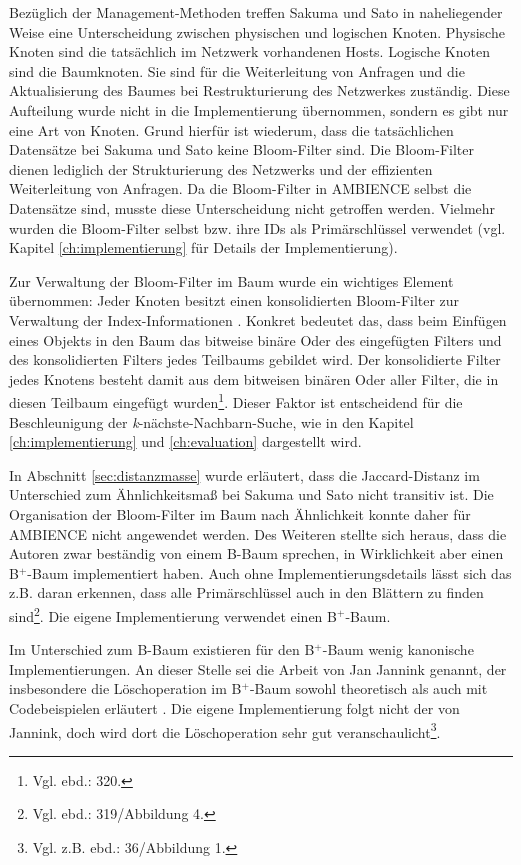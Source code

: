Bezüglich der Management-Methoden treffen Sakuma und Sato in naheliegender Weise eine Unterscheidung zwischen physischen und logischen Knoten. Physische Knoten sind die tatsächlich im Netzwerk vorhandenen Hosts. Logische Knoten sind die Baumknoten. Sie sind für die Weiterleitung von Anfragen und die Aktualisierung des Baumes bei Restrukturierung des Netzwerkes zuständig. Diese Aufteilung wurde nicht in die Implementierung übernommen, sondern es gibt nur eine Art von Knoten. Grund hierfür ist wiederum, dass die tatsächlichen Datensätze bei Sakuma und Sato keine Bloom-Filter sind. Die Bloom-Filter dienen lediglich der Strukturierung des Netzwerks und der effizienten Weiterleitung von Anfragen. Da die Bloom-Filter in AMBIENCE selbst die Datensätze sind, musste diese Unterscheidung nicht getroffen werden. Vielmehr wurden die Bloom-Filter selbst bzw. ihre IDs als Primärschlüssel verwendet (vgl. Kapitel \ref{ch:implementierung} für Details der Implementierung). 

Zur Verwaltung der Bloom-Filter im Baum wurde ein wichtiges Element übernommen: Jeder Knoten besitzt einen konsolidierten Bloom-Filter zur Verwaltung der Index-Informationen \cite{Sakuma2011}. Konkret bedeutet das, dass beim Einfügen eines Objekts in den Baum das bitweise binäre Oder des eingefügten Filters und des konsolidierten Filters jedes Teilbaums gebildet wird. Der konsolidierte Filter jedes Knotens besteht damit aus dem bitweisen binären Oder aller Filter, die in diesen Teilbaum eingefügt wurden\footnote{Vgl. ebd.: 320.}. Dieser Faktor ist entscheidend für die Beschleunigung der \textit{k}-nächste-Nachbarn-Suche, wie in den Kapitel \ref{ch:implementierung} und \ref{ch:evaluation} dargestellt wird. 

In Abschnitt \ref{sec:distanzmasse} wurde erläutert, dass die Jaccard-Distanz im Unterschied zum Ähnlichkeitsmaß bei Sakuma und Sato nicht transitiv ist. Die Organisation der Bloom-Filter im Baum nach Ähnlichkeit konnte daher für AMBIENCE nicht angewendet werden. Des Weiteren stellte sich heraus, dass die Autoren zwar beständig von einem B-Baum sprechen, in Wirklichkeit aber einen B$^+$-Baum implementiert haben. Auch ohne Implementierungsdetails lässt sich das z.B. daran erkennen, dass alle Primärschlüssel auch in den Blättern zu finden sind\footnote{Vgl. ebd.: 319/Abbildung 4.}. Die eigene Implementierung verwendet einen B$^+$-Baum. 

Im Unterschied zum B-Baum existieren für den B$^+$-Baum wenig kanonische Implementierungen. An dieser Stelle sei die Arbeit von Jan Jannink genannt, der insbesondere die Löschoperation im B$^+$-Baum sowohl theoretisch als auch mit Codebeispielen erläutert \cite{Jannink1995}. Die eigene Implementierung folgt nicht der von Jannink, doch wird dort die Löschoperation sehr gut veranschaulicht\footnote{Vgl. z.B. ebd.: 36/Abbildung 1.}. 
